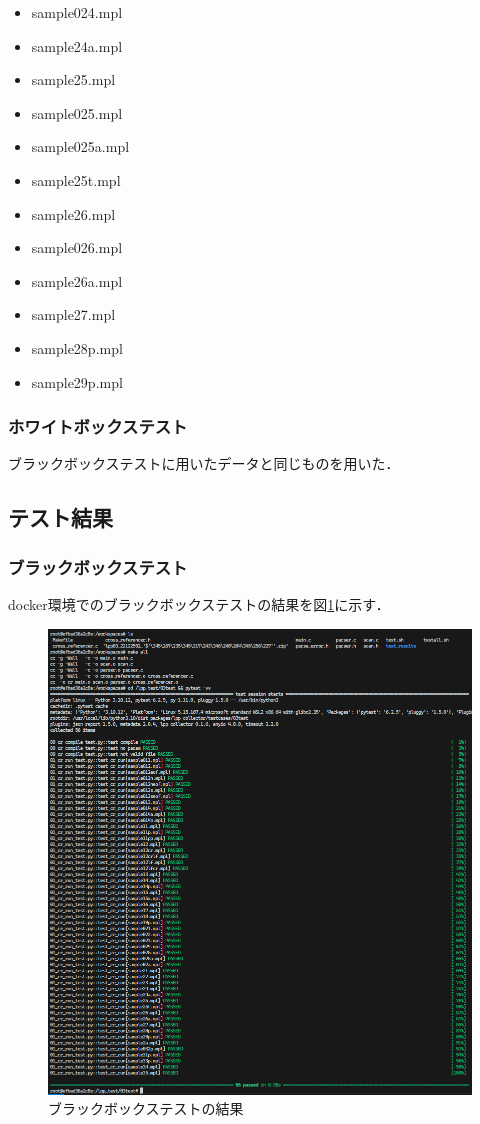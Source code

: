 \documentclass{jlreq}
\begin{document}
\begin{itemize}
  \item sample024.mpl
  \item sample24a.mpl
  \item sample25.mpl
  \item sample025.mpl
  \item sample025a.mpl
  \item sample25t.mpl
  \item sample26.mpl
  \item sample026.mpl
  \item sample26a.mpl
  \item sample27.mpl
  \item sample28p.mpl
  \item sample29p.mpl
\end{itemize}

\subsubsection{ホワイトボックステスト}
ブラックボックステストに用いたデータと同じものを用いた．

\subsection{テスト結果}
\subsubsection{ブラックボックステスト}
docker環境でのブラックボックステストの結果を図\ref{fig:black_box_test}に示す．
\begin{figure}[H]
  \centering
  \includegraphics[width=\textwidth]{assets/black_box_test.png}
  \caption{ブラックボックステストの結果}
  \label{fig:black_box_test}
\end{figure}
\end{document}

